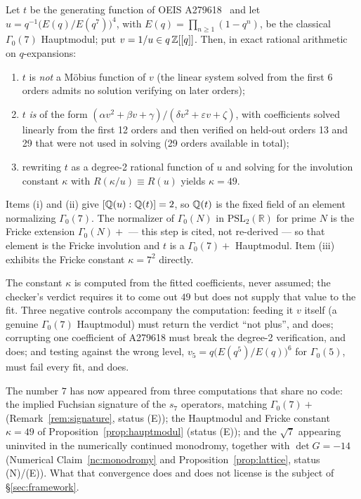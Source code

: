 \begin{proposition}
\label{prop:hauptmodul}
Let $t$ be the generating function of OEIS A279618~\cite{OEIS} and let
$u = q^{-1}\bigl(E(q)/E(q^7)\bigr)^4$, with $E(q)=\prod_{n\geq1}(1-q^n)$, be
the classical $\Gamma_0(7)$ Hauptmodul; put $v = 1/u \in q\,\mathbb{Z}[[q]]$. Then,
in exact rational arithmetic on $q$-expansions:
\begin{enumerate}
\item $t$ is \emph{not} a M\"obius function of $v$ (the linear system solved
  from the first 6 orders admits no solution verifying on later orders);
\item $t$ \emph{is} of the form $(\alpha v^2+\beta v+\gamma)/(\delta
  v^2+\varepsilon v+\zeta)$, with coefficients solved linearly from the first
  12 orders and then verified on held-out orders 13 and 29 that were not used
  in solving (29 orders available in total);
\item rewriting $t$ as a degree-2 rational function of $u$ and solving for the
  involution constant $\kappa$ with $R(\kappa/u)\equiv R(u)$ yields
  $\kappa = 49$.
\end{enumerate}
Items (i) and (ii) give $[\mathbb{Q}(u):\mathbb{Q}(t)] = 2$, so $\mathbb{Q}(t)$ is the fixed field of
an element normalizing $\Gamma_0(7)$. The normalizer of $\Gamma_0(N)$ in
$\mathrm{PSL}_2(\mathbb{R})$ for prime $N$ is the Fricke extension
$\Gamma_0(N)+$ \cite{AtkinLehner1970} --- this step is cited, not re-derived
--- so that element is the Fricke involution and $t$ is a $\Gamma_0(7)+$
Hauptmodul. Item (iii) exhibits the Fricke constant $\kappa = 7^2$ directly.
\end{proposition}

The constant $\kappa$ is computed from the fitted coefficients, never assumed;
the checker's verdict requires it to come out $49$ but does not supply that
value to the fit. Three negative controls accompany the computation: feeding
it $v$ itself (a genuine $\Gamma_0(7)$ Hauptmodul) must return the verdict
``not plus'', and does; corrupting one coefficient of A279618 must break the
degree-2 verification, and does; and testing against the wrong level,
$v_5 = q\bigl(E(q^5)/E(q)\bigr)^6$ for $\Gamma_0(5)$, must fail every fit, and
does.

\begin{remark}
\label{rem:level-indicators}
The number $7$ has now appeared from three computations that share no code:
the implied Fuchsian signature of the $s_7$ operators, matching
$\Gamma_0(7)+$ (Remark~\ref{rem:signature}, status (E)); the Hauptmodul and
Fricke constant $\kappa = 49$ of Proposition~\ref{prop:hauptmodul} (status
(E)); and the $\sqrt7$ appearing uninvited in the numerically continued
monodromy, together with $\det G = -14$ (Numerical Claim~\ref{nc:monodromy}
and Proposition~\ref{prop:lattice}, status (N)/(E)). What that convergence
does and does not license is the subject of \S\ref{sec:framework}.
\end{remark}

